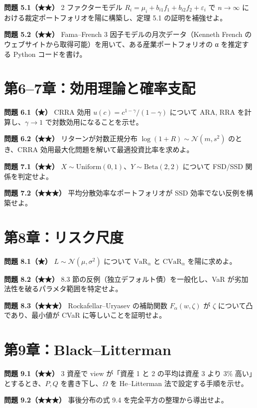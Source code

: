 \documentclass[11pt,a4paper]{report}
\begin{document}
\textbf{問題 5.1（★★）} 2 ファクターモデル $R_i = \mu_i + b_{i1} f_1 + b_{i2} f_2 + \varepsilon_i$ で $n \to \infty$ における裁定ポートフォリオを陽に構築し、定理 5.1 の証明を補強せよ。

\textbf{問題 5.2（★★）} Fama–French 3 因子モデルの月次データ（Kenneth French のウェブサイトから取得可能）を用いて、ある産業ポートフォリオの α を推定する Python コードを書け。

\section{第6–7章：効用理論と確率支配}

\textbf{問題 6.1（★）} CRRA 効用 $u(c) = c^{1-\gamma}/(1-\gamma)$ について ARA, RRA を計算し、$\gamma \to 1$ で対数効用になることを示せ。

\textbf{問題 6.2（★★）} リターンが対数正規分布 $\log(1 + R) \sim \mathcal{N}(m, s^2)$ のとき、CRRA 効用最大化問題を解いて最適投資比率を求めよ。

\textbf{問題 7.1（★★）} $X \sim \mathrm{Uniform}(0,1)$、$Y \sim \mathrm{Beta}(2, 2)$ について FSD/SSD 関係を判定せよ。

\textbf{問題 7.2（★★★）} 平均分散効率なポートフォリオが SSD 効率でない反例を構築せよ。

\section{第8章：リスク尺度}

\textbf{問題 8.1（★）} $L \sim \mathcal{N}(\mu, \sigma^2)$ について $\mathrm{VaR}_\alpha$ と $\mathrm{CVaR}_\alpha$ を陽に求めよ。

\textbf{問題 8.2（★★）} 8.3 節の反例（独立デフォルト債）を一般化し、VaR が劣加法性を破るパラメタ範囲を特定せよ。

\textbf{問題 8.3（★★★）} Rockafellar–Uryasev の補助関数 $F_\alpha(w, \zeta)$ が $\zeta$ について凸であり、最小値が CVaR に等しいことを証明せよ。

\section{第9章：Black–Litterman}

\textbf{問題 9.1（★★）} 3 資産で view が「資産 1 と 2 の平均は資産 3 より 3\% 高い」とするとき、$P, Q$ を書き下し、$\Omega$ を He–Litterman 法で設定する手順を示せ。

\textbf{問題 9.2（★★★）} 事後分布の式 9.4 を完全平方の整理から導出せよ。
\end{document}
